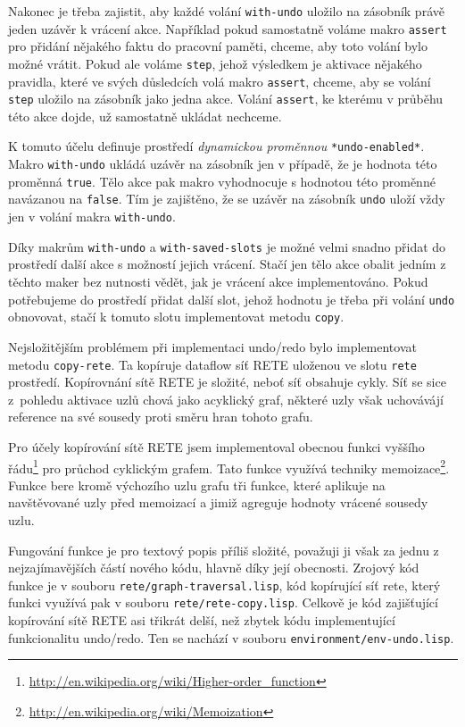 Nakonec je třeba zajistit, aby každé volání \verb|with-undo| uložilo na zásobník
právě jeden uzávěr k vrácení akce. Například pokud samostatně voláme makro
\verb|assert| pro přidání nějakého faktu do pracovní paměti, chceme, aby toto volání
bylo možné vrátit. Pokud ale voláme \verb|step|, jehož výsledkem je aktivace
nějakého pravidla, které ve svých důsledcích volá makro \verb|assert|, chceme,
aby se volání \verb|step| uložilo na zásobník jako jedna akce. Volání
\verb|assert|, ke kterému v průběhu této akce dojde, už samostatně ukládat
nechceme.

K tomuto účelu definuje prostředí \emph{dynamickou proměnnou}
\verb|*undo-enabled*|.  Makro \verb|with-undo| ukládá uzávěr na zásobník jen v
případě, že je hodnota této proměnná \verb|true|. Tělo akce pak makro
vyhodnocuje s hodnotou této proměnné navázanou na \verb|false|. Tím je
zajištěno, že se uzávěr na zásobník \verb|undo| uloží vždy jen v
 volání makra \verb|with-undo|.

Díky makrům \verb|with-undo| a \verb|with-saved-slots| je možné velmi snadno
přidat do prostředí další akce s možností jejich vrácení. Stačí jen tělo akce
obalit jedním z těchto maker bez nutnosti vědět, jak je vrácení akce
implementováno. Pokud potřebujeme do prostředí přidat další slot, jehož hodnotu
je třeba při volání \verb|undo| obnovovat, stačí k tomuto slotu implementovat
metodu \verb|copy|.

Nejsložitějším problémem při implementaci undo/redo bylo implementovat metodu
\verb|copy-rete|. Ta kopíruje dataflow síť RETE uloženou ve slotu \verb|rete|
prostředí. Kopírovnání sítě RETE je složité, neboť síť obsahuje cykly. Síť se
sice z~pohledu aktivace uzlů chová jako acyklický graf, některé uzly však
uchovávájí reference na své sousedy proti směru hran tohoto grafu.

Pro účely kopírování sítě RETE jsem implementoval obecnou funkci vyššího
řádu\footnote{\url{http://en.wikipedia.org/wiki/Higher-order_function}}
pro průchod cyklickým grafem. Tato funkce využívá techniky
memoizace\footnote{\url{http://en.wikipedia.org/wiki/Memoization}}. Funkce bere
kromě výchozího uzlu grafu tři funkce, které aplikuje na navštěvované uzly před
memoizací a jimiž agreguje hodnoty vrácené sousedy uzlu.

Fungování funkce je pro textový popis příliš složité, považuji ji však za jednu
z nejzajímavějších částí nového kódu, hlavně díky její obecnosti. Zrojový kód
funkce je v souboru \verb|rete/graph-traversal.lisp|, kód kopírující síť rete,
který funkci využívá pak v souboru \verb|rete/rete-copy.lisp|. Celkově je kód
zajišťující kopírování sítě RETE asi třikrát delší, než zbytek kódu
implementující funkcionalitu undo/redo. Ten se nachází v souboru
\verb|environment/env-undo.lisp|.
